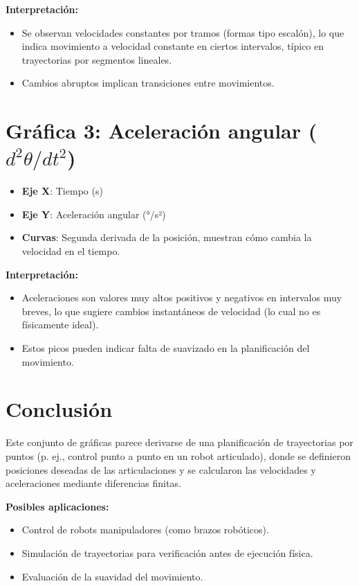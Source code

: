 	\textbf{Interpretación:}
	\begin{itemize}
		\item Se observan velocidades constantes por tramos (formas tipo escalón), lo que indica movimiento a velocidad constante en ciertos intervalos, típico en trayectorias por segmentos lineales.
		\item Cambios abruptos implican transiciones entre movimientos.
	\end{itemize}
	
	
	\section*{Gráfica 3: Aceleración angular ($d^2\theta/dt^2$)}
	
	\begin{itemize}
		\item \textbf{Eje X}: Tiempo (s)
		\item \textbf{Eje Y}: Aceleración angular (°/s²)
		\item \textbf{Curvas}: Segunda derivada de la posición, muestran cómo cambia la velocidad en el tiempo.
	\end{itemize}
	
	\textbf{Interpretación:}
	\begin{itemize}
		\item Aceleraciones son valores muy altos positivos y negativos en intervalos muy breves, lo que sugiere cambios instantáneos de velocidad (lo cual no es físicamente ideal).
		\item Estos picos pueden indicar falta de suavizado en la planificación del movimiento.
	\end{itemize}
	
	
	\section*{Conclusión}
	
	Este conjunto de gráficas parece derivarse de una planificación de trayectorias por puntos (p. ej., control punto a punto en un robot articulado), donde se definieron posiciones deseadas de las articulaciones y se calcularon las velocidades y aceleraciones mediante diferencias finitas.
	
	\textbf{Posibles aplicaciones:}
	\begin{itemize}
		\item Control de robots manipuladores (como brazos robóticos).
		\item Simulación de trayectorias para verificación antes de ejecución física.
		\item Evaluación de la suavidad del movimiento.
	\end{itemize}
	


